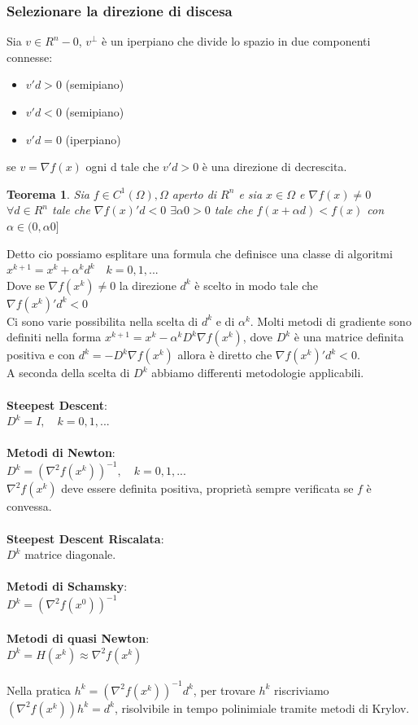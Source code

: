 \documentclass[a4paper, 12pt]{article}
\newtheorem{theorem}{Teorema}
\begin{document}
\subsubsection{Selezionare la direzione di discesa}
Sia $v \in R^n-0$, $v^\perp$ è un iperpiano che divide lo spazio in due componenti connesse:
\begin{itemize}
  \item $v'd > 0$ (semipiano)
  \item $v'd < 0$ (semipiano)
  \item $v'd = 0$ (iperpiano)
\end{itemize}
se $v = \nabla f(x)$ ogni d tale che $v'd > 0$ è una direzione di decrescita.
\begin{theorem}
Sia $f \in C^1(\Omega), \Omega$ aperto di $R^n$ e sia $x \in \Omega$ e $\nabla f(x) \neq 0$ $\forall d \in R^n$ tale che $\nabla f(x)'d < 0$  $\exists \alpha 0 > 0$ tale che $f(x + \alpha d) < f(x)$ con $\alpha \in (0, \alpha0]$
\end{theorem}
Detto cio possiamo esplitare una formula che definisce una classe di algoritmi\\
$x^{k+1} = x^k + \alpha^k d^k \quad k=0, 1, ...$\\
Dove se $\nabla f(x^k) \neq 0$ la direzione $d^k$ è scelto in modo tale che\\
$\nabla f(x^k)'d^k < 0$\\
Ci sono varie possibilita nella scelta di $d^k$ e di $\alpha^k$. Molti metodi di gradiente sono definiti nella forma 
$x^{k+1} = x^k - \alpha^k D^k \nabla f(x^k)$,
dove $D^k$ è una matrice definita positiva e con $d^k = -D^k\nabla f(x^k)$ allora è diretto che $\nabla f(x^k)'d^k < 0$.\\
A seconda della scelta di $D^k$ abbiamo differenti metodologie applicabili.\\\\
\textbf{Steepest Descent}:\\
$D^k = I, \quad k = 0, 1, ...$\\\\
\textbf{Metodi di Newton}:\\
$D^k = (\nabla^2 f(x^k))^{-1}, \quad k = 0, 1, ...$\\
$\nabla^2 f(x^k)$ deve essere definita positiva, proprietà sempre verificata se $f$ è convessa.\\\\
\textbf{Steepest Descent Riscalata}:\\
$D^k$ matrice diagonale.\\\\
\textbf{Metodi di Schamsky}:\\
$D^k = (\nabla^2 f(x^0))^{-1}$\\\\
\textbf{Metodi di quasi Newton}:\\
$D^k = H(x^k) \approx \nabla^2 f(x^k)$\\\\
Nella pratica $h^k = (\nabla^2 f(x^k))^{-1} d^k$, per trovare $h^k$ riscriviamo $(\nabla^2 f(x^k))h^k = d^k$, risolvibile in tempo polinimiale tramite metodi di Krylov.
\end{document}

